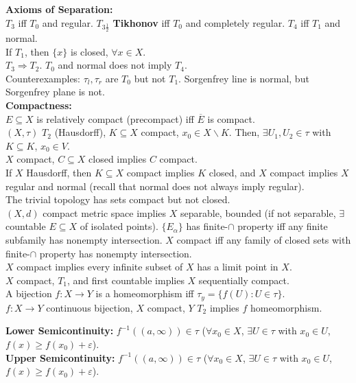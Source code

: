 \documentclass[11pt]{article}
\newcommand{\inv}{^{-1}}
\newcommand{\sminus}{\backslash}
\newcommand{\e}{\varepsilon} %
\begin{document}
{\bf Axioms of Separation:} \\
$T_3$ iff $T_0$ and regular. $T_{3\frac{1}{2}}$ {\bf Tikhonov} iff $T_0$ and
completely regular. $T_4$ iff $T_1$ and normal. \\
If $T_1$, then $\{x\}$ is closed, $\forall x \in X$. \\
$T_3 \Rightarrow T_2$. $T_0$ and normal does not imply $T_4$. \\
Counterexamples: $\tau_l,\tau_r$ are $T_0$ but not $T_1$. Sorgenfrey line is
normal, but Sorgenfrey plane is not. \\
{\bf Compactness:} \\
$E \subseteq X$ is relatively compact (precompact) iff $\overline{E}$ is
compact. \\
$(X,\tau)$ $T_2$ (Hausdorff), $K \subseteq X$ compact, $x_0 \in X \sminus K$.
Then, $\exists U_1,U_2 \in \tau$ with $K \subseteq K$, $x_0 \in V$. \\
$X$ compact, $C \subseteq X$ closed implies $C$ compact. \\
If $X$ Hausdorff, then $K \subseteq X$ compact implies $K$ closed, and $X$
compact implies $X$ regular and normal (recall that normal does not always imply
regular). \\
The trivial topology has sets compact but not closed. \\
$(X,d)$ compact metric space implies $X$ separable, bounded (if not
separable, $\exists$ countable $E \subseteq X$ of isolated points).
$\{E_{\alpha}\}$ has finite-$\cap$ property iff any finite subfamily
has nonempty intersection. $X$ compact iff any family of closed sets with
finite-$\cap$ property has nonempty intersection.\\
$X$ compact implies every infinite subset of $X$ has a limit point in $X$. \\
$X$ compact, $T_1$, and first countable implies $X$ sequentially compact. \\
A bijection $f: X \rightarrow Y$ is a homeomorphism iff
$\tau_y = \{f(U) : U \in \tau\}$. \\
$f : X \rightarrow Y$ continuous bijection, $X$ compact, $Y$ $T_2$ implies $f$
homeomorphism.

{\bf Lower Semicontinuity:} $f\inv((a,\infty)) \in \tau$ ($\forall x_0 \in X$,
$\exists U \in \tau$ with $x_0 \in U$, $f(x) \geq f(x_0) + \e$). \\
{\bf Upper Semicontinuity:} $f\inv((a,\infty)) \in \tau$ ($\forall x_0 \in X$,
$\exists U \in \tau$ with $x_0 \in U$, $f(x) \geq f(x_0) + \e$).
\end{document}
